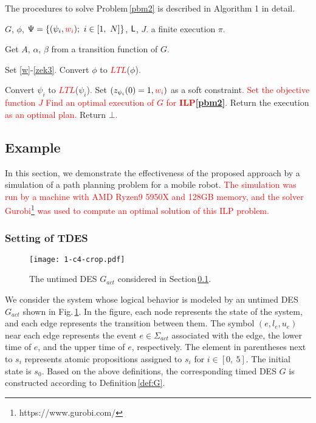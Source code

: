 \documentclass[journal,twoside,web]{IEEEtran}
\newcommand{\rdef}[1]{Definition\,\ref{#1}}
\newcommand{\req}[1]{\eqref{#1}}
\newcommand{\rpbm}[1]{Problem\,\ref{#1}}
\newcommand{\rsec}[1]{Section\,\ref{#1}}
\newcommand{\rfig}[1]{Fig.\,\ref{#1}}
\newcommand{\Len}{{\sf L}}
\newcommand{\red}[1]{\textcolor{red}{#1}}
\begin{document}
The procedures to solve \rpbm{pbm2} is described in Algorithm 1 in detail. 
%
%
%
\begin{algorithm}
\caption{: FIND($G,\phi,\Psi,\Len,J$): algorithm \red{for finding an optimal plan of \rpbm{pbm2}}. } \label{alg_solve_maxsat}
\begin{algorithmic}
%
\Require $G$, $\phi$, $\Psi=\{(\psi_i,\red{w_i});\ i\in[1,\ N]\}$, $\Len$, $J$\red{.}
\Ensure a finite execution $\pi$\red{.}

\State Get $A$, $\alpha$, $\beta$ from a transition function of $G$\red{.}

\State Set \req{w}-\req{zek3}\red{.}
\State Convert $\phi$ to \red{$LTL$}($\phi$)\red{.}

	\State Convert $\psi_{i}$ to \red{$LTL$}($\psi_{i}$)\red{.}
	\State Set $(z_{\psi_i}(0)=1,\red{w_i})$ as a soft constraint\red{.}
	\EndFor
\EndIf
\State \red{Set the objective function $J$
\State Find an optimal execution of $G$ for {\bf ILP\ref{pbm2}}.}
	\State Return the execution \red{as an optimal plan.}
\Else
	\State  Return $\bot$\red{.}
\EndIf
\end{algorithmic}
\end{algorithm}
%

%
\subsection{Example}\label{sec:sim1}
%
In this section, we demonstrate the effectiveness of the proposed approach by a simulation of a path planning problem for a mobile robot.
\red{The simulation was run by a machine with AMD Ryzen9 5950X and 128GB memory, and the solver Gurobi\footnote{https://www.gurobi.com/} was used to compute an optimal solution of this ILP problem.}
%
\subsubsection{Setting of TDES}
\label{settingDES}
%
%
\begin{figure}
\centering 
\texttt{[image: 1-c4-crop.pdf]}
\caption{The untimed DES $G_{act}$ considered in \rsec{sec:sim1}.}
\label{sim1}
\end{figure}
%
We consider the system whose logical behavior is modeled by an untimed DES $G_{act}$ shown in \rfig{sim1}.
In the figure, each node represents the state of the system, and each edge represents the transition between them. 
The symbol $(e,l_e,u_e)$ near each edge represents the event  $e\in\Sigma_{act}$ associated with the edge, the lower time of $e$, and the upper time of $e$, respectively. The element in parentheses next to $s_i$ represents atomic propositions assigned to $s_i$ for $i\in[0,~5]$.
The initial state is $s_0$.
%
Based on the above definitions, the corresponding timed DES $G$ is constructed according to \rdef{def:G}. 
%
\end{document}
